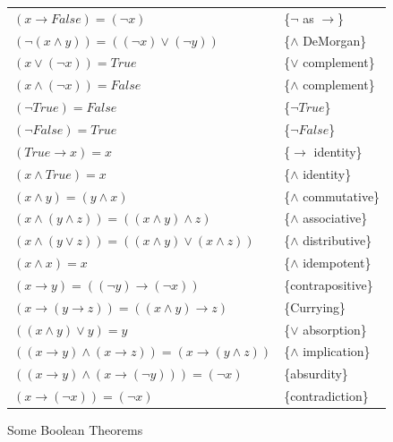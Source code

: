 \begin{figure}
\begin{center}
\begin{tabular}{ll}
$(x \rightarrow False) = (\neg x)$                                   & \{$\neg$ as $\rightarrow$\}\label{neg-as-imp} \\
$(\neg(x \wedge y)) = ((\neg x) \vee (\neg y))$                      & \{$\wedge$ DeMorgan\}      \label{and-DeMorgan} \\
$(x \vee (\neg x)) = True$                                           & \{$\vee$ complement\}      \label{or-complement} \\
$(x \wedge (\neg x)) = False$                                        & \{$\wedge$ complement\}    \label{and-complement} \\
$(\neg True) = False$                                                & \{$\neg True$\}            \label{not-True} \\
$(\neg False) = True$                                                & \{$\neg False$\}           \label{not-False} \\
$(True \rightarrow x) = x$                                           & \{$\rightarrow$ identity\} \label{imp-identity} \\
$(x \wedge True) = x$                                                & \{$\wedge$ identity\}      \label{and-identity} \\
$(x \wedge y) = (y \wedge x)$                                        & \{$\wedge$ commutative\}   \label{and-commutative} \\
$(x \wedge (y \wedge z)) = ((x \wedge y) \wedge z)$                  & \{$\wedge$ associative\}   \label{and-associative} \\
$(x \wedge (y \vee z)) = ((x \wedge y) \vee (x \wedge z))$           & \{$\wedge$ distributive\}  \label{and-distributive} \\
$(x \wedge x) = x$                                                   & \{$\wedge$ idempotent\}    \label{and-idempotent} \\
$(x \rightarrow y) = ((\neg y) \rightarrow (\neg x))$                & \{contrapositive\}         \label{contrapositive} \\
$(x \rightarrow (y \rightarrow z)) = ((x \wedge y) \rightarrow z)$   & \{Currying\}               \label{currying} \\
$((x \wedge y) \vee y) = y$                                          & \{$\vee$ absorption\}      \label{or-absorption} \\
$((x \rightarrow y) \wedge (x \rightarrow z)) = (x \rightarrow (y \wedge z))$ & \{$\wedge$ implication\} \label{and-implication} \\
$((x \rightarrow y) \wedge (x \rightarrow (\neg y))) = (\neg x)$     & \{absurdity\}              \label{absurdity} \\
$(x \rightarrow (\neg x)) = (\neg x)$                                & \{contradiction\}          \label{boolean-contradiction} \\
\end{tabular}
\end{center}
\caption{Some Boolean Theorems}
\label{some-boolean-theorems}
\end{figure}

